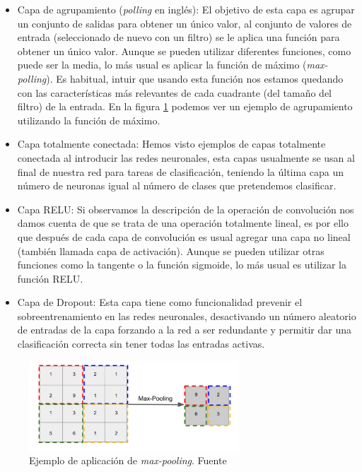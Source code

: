 \begin{itemize}
	\item Capa de agrupamiento (\textit{polling} en inglés): El objetivo de esta capa es agrupar un conjunto de salidas para obtener un único valor, al conjunto de valores de entrada (seleccionado de nuevo con un filtro) se le aplica una función para obtener un único valor. Aunque se pueden utilizar diferentes funciones, como puede ser la media, lo más usual es aplicar la función de máximo (\textit{max-polling}). Es habitual, intuir que usando esta función nos estamos quedando con las características más relevantes de cada cuadrante (del tamaño del filtro) de la entrada. En la figura \ref{fig:pooling} podemos ver un ejemplo de agrupamiento utilizando la función de máximo. 
	\item Capa totalmente conectada: Hemos visto ejemplos de capas totalmente conectada al introducir las redes neuronales, esta capas usualmente se usan al final de nuestra red para tareas de clasificación, teniendo la última capa un número de neuronas igual al número de clases que pretendemos clasificar. 
	\item Capa RELU: Si observamos la descripción de la operación de convolución nos damos cuenta de que se trata de una operación totalmente lineal, es por ello que después de cada capa de convolución es usual agregar una capa no lineal (también llamada capa de activación). Aunque se pueden utilizar otras funciones como la tangente o la función sigmoide, lo más usual es utilizar la función RELU.
	
	\item Capa de Dropout: Esta capa tiene como funcionalidad prevenir el sobreentrenamiento en las redes neuronales, desactivando un número aleatorio de entradas de la capa forzando a la red a ser redundante y permitir dar una clasificación correcta sin tener todas las entradas activas. 
	
\end{itemize}

\begin{figure}[!ht]
	\centering
	\includegraphics[width=0.7\textwidth]{images/arte/pooling}
	\caption{Ejemplo de aplicación de \textit{max-pooling}. Fuente \cite{temariodeeplearning}}
	\label{fig:pooling}
\end{figure}


